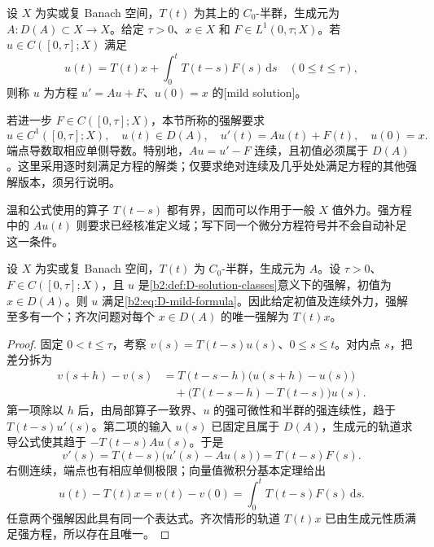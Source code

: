 \begin{definition}[抽象初值问题的两种解]
\label{b2:def:D-solution-classes}
设 \(X\) 为实或复 Banach 空间，\(T(t)\) 为其上的 \(C_0\)-半群，生成元为 \(A:D(A)\subset X\to X\)。给定 \(\tau>0\)、\(x\in X\) 和 \(F\in L^1(0,\tau;X)\)。若 \(u\in C([0,\tau];X)\) 满足
\begin{equation}\label{b2:eq:D-mild-formula}
 u(t)=T(t)x+\int_0^tT(t-s)F(s)\,\mathrm ds
 \quad(0\leq t\leq\tau),
\end{equation}
则称 \(u\) 为方程 \(u'=Au+F\)、\(u(0)=x\) 的[mild solution]。

\ProseParagraphBreak

若进一步 \(F\in C([0,\tau];X)\)，本节所称的强解要求
\[
 u\in C^1([0,\tau];X),\quad
 u(t)\in D(A),\quad
 u'(t)=Au(t)+F(t),\quad u(0)=x.
\]
端点导数取相应单侧导数。特别地，\(Au=u'-F\) 连续，且初值必须属于 \(D(A)\)。这里采用逐时刻满足方程的解类；仅要求绝对连续及几乎处处满足方程的其他强解版本，须另行说明。
\end{definition}

温和公式使用的算子 \(T(t-s)\) 都有界，因而可以作用于一般 \(X\) 值外力。强方程中的 \(Au(t)\) 则要求已经核准定义域；写下同一个微分方程符号并不会自动补足这一条件。

\begin{proposition}[强解的变常数公式]
\label{b2:prop:D-classical-variation}
设 \(X\) 为实或复 Banach 空间，\(T(t)\) 为 \(C_0\)-半群，生成元为 \(A\)。设 \(\tau>0\)、\(F\in C([0,\tau];X)\)，且 \(u\) 是\cref{b2:def:D-solution-classes}意义下的强解，初值为 \(x\in D(A)\)。则 \(u\) 满足\eqref{b2:eq:D-mild-formula}。因此给定初值及连续外力，强解至多有一个；齐次问题对每个 \(x\in D(A)\) 的唯一强解为 \(T(t)x\)。
\end{proposition}
\begin{proof}
固定 \(0<t\leq\tau\)，考察 \(v(s)=T(t-s)u(s)\)、\(0\leq s\leq t\)。对内点 \(s\)，把差分拆为
\[
 \begin{aligned}
 v(s+h)-v(s)
 &=T(t-s-h)\bigl(u(s+h)-u(s)\bigr)\\
 &\quad+\bigl(T(t-s-h)-T(t-s)\bigr)u(s).
 \end{aligned}
\]
第一项除以 \(h\) 后，由局部算子一致界、\(u\) 的强可微性和半群的强连续性，趋于 \(T(t-s)u'(s)\)。第二项的输入 \(u(s)\) 已固定且属于 \(D(A)\)，生成元的轨道求导公式使其趋于 \(-T(t-s)Au(s)\)。于是
\[
 v'(s)=T(t-s)\bigl(u'(s)-Au(s)\bigr)=T(t-s)F(s).
\]
右侧连续，端点也有相应单侧极限；向量值微积分基本定理给出
\[
 u(t)-T(t)x=v(t)-v(0)=\int_0^tT(t-s)F(s)\,\mathrm ds.
\]
任意两个强解因此具有同一个表达式。齐次情形的轨道 \(T(t)x\) 已由生成元性质满足强方程，所以存在且唯一。
\end{proof}

